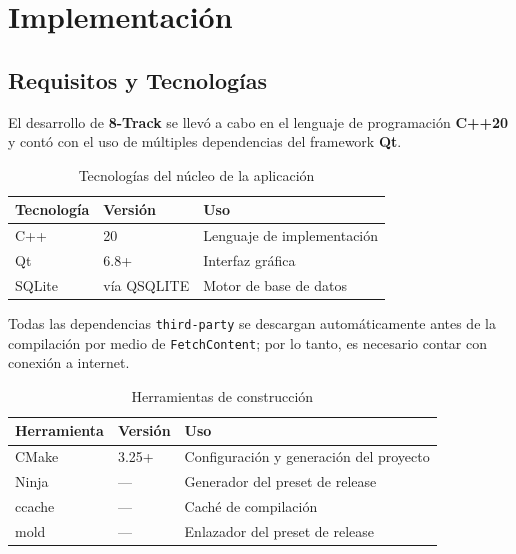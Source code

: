 \section{Implementación}

\subsection{Requisitos y Tecnologías}

El desarrollo de \textbf{8-Track} se llevó a cabo en el lenguaje de programación \textbf{C++20} y contó con el
uso de múltiples dependencias del framework \textbf{Qt}.

\begin{table}[htbp]
	\centering
	\begin{tabularx}{\textwidth}{@{}llX@{}}
		\toprule
		Tecnología & Versión     & Uso                        \\
		\midrule
		C++        & 20          & Lenguaje de implementación \\
		Qt         & 6.8+        & Interfaz gráfica           \\
		SQLite     & vía QSQLITE & Motor de base de datos     \\
		\bottomrule
	\end{tabularx}
	\caption{Tecnologías del núcleo de la aplicación}
\end{table}

Todas las dependencias \texttt{third-party} se descargan automáticamente antes de la compilación por medio
de \texttt{FetchContent}; por lo tanto, es necesario contar con conexión a internet.

\begin{table}[htbp]
	\centering
	\begin{tabularx}{\textwidth}{@{}llX@{}}
		\toprule
		Herramienta & Versión & Uso                                     \\
		\midrule
		CMake       & 3.25+   & Configuración y generación del proyecto \\
		Ninja       & ---     & Generador del preset de release         \\
		ccache      & ---     & Caché de compilación                    \\
		mold        & ---     & Enlazador del preset de release         \\
		\bottomrule
	\end{tabularx}
	\caption{Herramientas de construcción}
\end{table}

